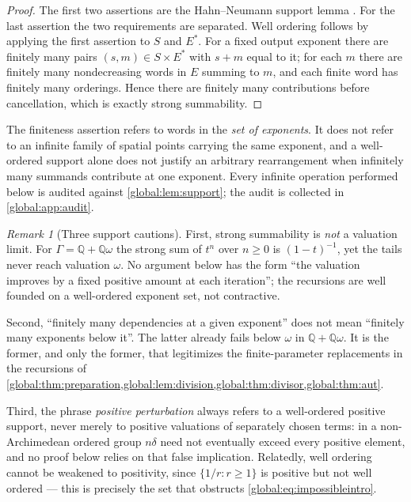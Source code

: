 \documentclass[11pt,letterpaper]{article}
\theoremstyle{definition}
\theoremstyle{remark}
\newtheorem{remark}[remark]{Remark}
\newcommand{\Q}{\mathbb Q}
\numberwithin{equation}{section}
\begin{document}
\begin{proof}
The first two assertions are the Hahn--Neumann support lemma \cite{Neumann,Poonen}. For the last assertion the two requirements are separated. Well ordering follows by applying the first assertion to $S$ and $E^*$. For a fixed output exponent there are finitely many pairs $(s,m)\in S\times E^*$ with $s+m$ equal to it; for each $m$ there are finitely many nondecreasing words in $E$ summing to $m$, and each finite word has finitely many orderings. Hence there are finitely many contributions before cancellation, which is exactly strong summability.
\end{proof}

The finiteness assertion refers to words in the \emph{set of exponents}. It does not refer to an infinite family of spatial points carrying the same exponent, and a well-ordered support alone does not justify an arbitrary rearrangement when infinitely many summands contribute at one exponent. Every infinite operation performed below is audited against \cref{global:lem:support}; the audit is collected in \cref{global:app:audit}.

\begin{remark}[Three support cautions]\label{global:rem:nonarch}
First, strong summability is \emph{not} a valuation limit. For $\Gamma=\Q+\Q\omega$ the strong sum of $t^n$ over $n\ge0$ is $(1-t)^{-1}$, yet the tails never reach valuation $\omega$. No argument below has the form ``the valuation improves by a fixed positive amount at each iteration''; the recursions are well founded on a well-ordered exponent set, not contractive.

Second, ``finitely many dependencies at a given exponent'' does not mean ``finitely many exponents below it''. The latter already fails below $\omega$ in $\Q+\Q\omega$. It is the former, and only the former, that legitimizes the finite-parameter replacements in the recursions of \cref{global:thm:preparation,global:lem:division,global:thm:divisor,global:thm:aut}.

Third, the phrase \emph{positive perturbation} always refers to a well-ordered positive support, never merely to positive valuations of separately chosen terms: in a non-Archimedean ordered group $n\delta$ need not eventually exceed every positive element, and no proof below relies on that false implication. Relatedly, well ordering cannot be weakened to positivity, since $\{1/r:r\ge1\}$ is positive but not well ordered --- this is precisely the set that obstructs \eqref{global:eq:impossibleintro}.
\end{remark}
\end{document}
